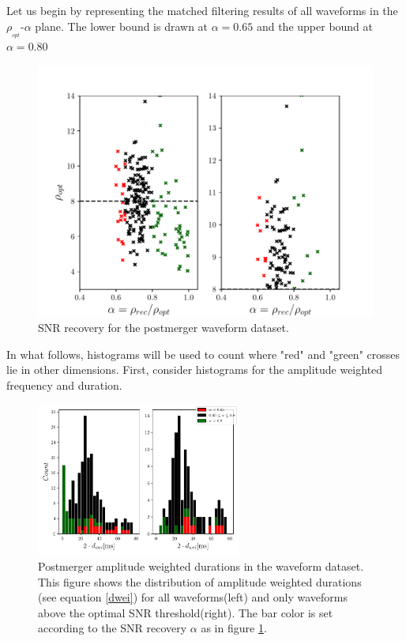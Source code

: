 Let us begin by representing the matched filtering results of all waveforms in the $\rho_{_{opt}}$-$\alpha$ plane. The lower bound is drawn at $\alpha=0.65$ and the upper bound at $\alpha=0.80$



\begin{figure}[hbt!]
\begin{center}
\includegraphics[width=\textwidth, angle=0]{images/Data_analysis/results/alpha_scatter.pdf}
\caption{SNR recovery for the postmerger waveform dataset.}
\label{ascatter}
\end{center}
\end{figure}

\FloatBarrier

\newpage
In what follows, histograms will be used to count where "red" and "green" crosses lie in other dimensions. First, consider histograms for the amplitude weighted frequency and duration.

\begin{figure}[hbt!]
\begin{center}
\includegraphics[width=0.6\textwidth, angle=0]{images/Data_analysis/results/alpha_dhist.pdf}
\captionsetup{width=0.8\textwidth}
\caption[Postmerger amplitude weighted durations in the waveform dataset]{Postmerger amplitude weighted durations in the waveform dataset. This figure shows the distribution of amplitude weighted durations (see equation \ref{dwei}) for all waveforms(left) and only waveforms above the optimal SNR threshold(right). The bar color is set according to the SNR recovery $\alpha$ as in figure \ref{ascatter}.}
\label{adhist}
\end{center}
\end{figure}

